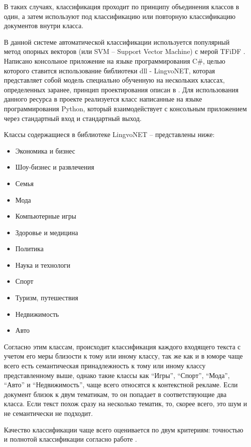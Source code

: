 В таких случаях, классификация проходит по принципу объединения классов в один, а затем используют под классификацию 
или повторную классификацию документов внутри класса.

В данной системе автоматической классификации используется популярный метод опорных векторов (или SVM – Support Vector Machine) 
с мерой TFiDF \cite{seman05}. Написано консольное приложение на языке программирования C\#, целью которого ставится использование библиотеки  
dll - LingvoNET, которая представляет собой модель специально обученную на нескольких классах, определенных заранее, 
принцип проектирования описан в \cite{neural09}. 
Для использования данного ресурса в проекте реализуется класс написанные на языке программирования Python, который 
взаимодействует с консольным приложением через стандартный вход и стандартный выход.

Классы содержащиеся в библиотеке LingvoNET – представлены ниже:
\begin{itemize}
  \item Экономика и бизнес
  \item Шоу-бизнес и развлечения
  \item Семья
  \item Мода
  \item Компьютерные игры
  \item Здоровье и медицина
  \item Политика
  \item Наука и технологи
  \item Спорт
  \item Туризм, путешествия
  \item Недвижимость
  \item Авто
\end{itemize}

Согласно этим классам, происходит классификация каждого входящего текста с учетом его меры близости к тому или иному классу, 
так же как и в юморе чаще всего есть семантическая принадлежность к тому или иному классу представленному выше, однако такие 
классы как “Игры”, “Спорт”, “Мода”, “Авто” и “Недвижимость”, чаще всего относятся к контекстной рекламе. 
Если документ близок к двум тематикам, то он попадает в соответствующие два класса. 
Если текст похож сразу на несколько тематик, то, скорее всего, это шум и не семантически не подходит.

Качество классификации чаще всего оценивается по двум критериям: точностью и полнотой классификации согласно работе \cite{neural07}.

